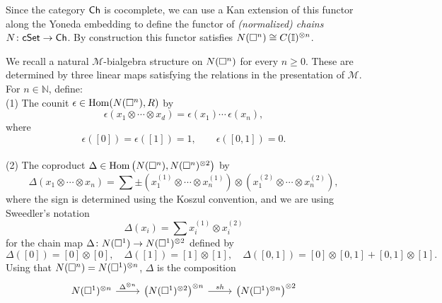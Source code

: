 Since the category $\mathsf{Ch}$ is cocomplete, we can use a Kan extension of this functor along the Yoneda embedding to define the functor of \textit{(normalized) chains} $N \colon \mathsf{cSet} \to \mathsf{Ch}$.
By construction this functor satisfies $N(\square^n) \cong C(\mathbb I)^{\otimes n}$.

We recall a natural $\mathcal M$-bialgebra structure on $N(\square^n)$ for every $n \geq 0$.
These are determined by three linear maps satisfying the relations in the presentation of $\mathcal M$.
For $n \in \mathbb{N}$, define: \vspace*{5pt} \\
(1) The counit $\epsilon \in \mathrm{Hom}(N(\square^n), R)$ by
\begin{equation*}
\epsilon \left( x_1 \otimes \cdots \otimes x_d \right) = \epsilon(x_1) \cdots \, \epsilon(x_n),
\end{equation*}
where
\begin{equation*}
\epsilon([0]) = \epsilon([1]) = 1, \qquad \epsilon([0, 1]) = 0.
\end{equation*} \vspace*{-6pt} \\
(2) The coproduct $\Delta \in \mathrm{Hom} \left( N(\square^n), N(\square^n)^{\otimes 2} \right)$ by
\begin{equation*}	
\Delta (x_1 \otimes \cdots \otimes x_n) = 	
\sum \pm \left( x_1^{(1)} \otimes \cdots \otimes x_n^{(1)} \right) \otimes 	
\left( x_1^{(2)} \otimes \cdots \otimes x_n^{(2)} \right),	
\end{equation*}	
where the sign is determined using the Koszul convention, and we are using Sweedler's notation
\begin{equation*}	
\Delta(x_i) = \sum x_i^{(1)} \otimes x_i^{(2)}
\end{equation*}
for the chain map $\Delta \colon N(\square^1) \to N(\square^1)^{\otimes 2}$ defined by
\begin{equation*}
\Delta([0]) = [0] \otimes [0], \quad \Delta([1]) = [1] \otimes [1], \quad \Delta([0, 1]) = [0] \otimes [0, 1] + [0, 1] \otimes [1].
\end{equation*}
Using that $N(\square^n) = N(\square^1)^{\otimes n}$, $\Delta$ is the composition
\begin{equation*}
\begin{tikzcd}
\cchains(\square^1)^{\otimes n} \arrow[r, "\Delta^{\otimes n}"] & \left( \cchains(\square^1)^{\otimes 2}  \right)^{\otimes n} \arrow[r, "sh"] & \left( \cchains(\square^1)^{\otimes n} \right)^{\otimes 2}
\end{tikzcd}
\end{equation*}
